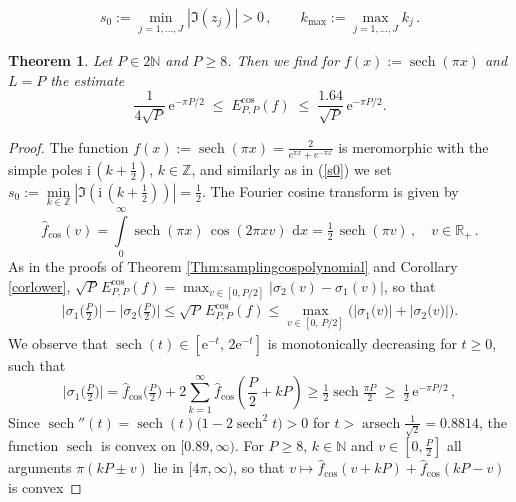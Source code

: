 \documentclass[10pt,a4paper]{amsart}
\newtheorem{theorem}{Theorem}
\newcommand{\Ecos}{E^{\cos}}
\newcommand{\N}{\mathbb N}
\newcommand{\Rp}{{\mathbb R}_{+}}
\newcommand{\Z}{\mathbb Z}
\renewcommand{\d}{\,\mathrm{d}}
\newcommand{\e}{\mathrm e}
\newcommand{\fcos}{{\hat f}_{\cos}}
\renewcommand{\i}{\mathrm i}
\begin{document}
\begin{align}\label{s0}
	s_0 := \min\limits_{j=1,\ldots,J} |\Im ( z_j)| > 0\,, \qquad k_{\max} := \max\limits_{j=1,\ldots,J} k_j\,.
\end{align}

\begin{theorem}
	\label{Ex:sech} Let $P \in 2 \N$  and $P \ge 8$. Then we find for $f(x) := \operatorname{sech}(\pi x)$ and $L=P$ the estimate
	\begin{equation}
		\label{eq:sechlower}
		\textstyle
		 \frac{1}{4\sqrt P}\,\e^{-\pi P/2} \;\leq\;
		\Ecos_{P,P}(f) \;\leq\; \frac{1.64}{\sqrt{P}}\,\e^{-\pi P/2}  .
	\end{equation}

\end{theorem}	

\begin{proof}
	The function $f(x) := \operatorname{sech}(\pi x) = \frac{2}{e^{\pi x} + e^{-\pi x}}$ is meromorphic with the
	simple poles $\i\,(k+\tfrac12)$, $k \in \Z$, and similarly as in (\ref{s0}) we set $s_0:=  \min\limits_{k \in {\mathbb Z}} |\Im( \i\,(k+\tfrac12))| = \frac{1}{2}$. The  Fourier cosine transform is given by
	$$
	\fcos(v) =  \textstyle \int\limits_0^{\infty} \operatorname{sech}(\pi x)\,\cos(2\pi x v)\,\d x
	= \tfrac12\,\operatorname{sech}(\pi v)\,, \quad v \in \Rp\,.
	$$
As in the proofs of Theorem \ref{Thm:samplingcospolynomial} and Corollary \ref{corlower},
$\sqrt{P}\,\Ecos_{P,P}(f) = \max_{v \in [0, P/2]} |\sigma_2(v)-\sigma_1(v)|$, so that
\begin{align}\label{eq:ung}
 \textstyle
\big|\sigma_1\big(\frac{P}{2}\big)\big| - \big|\sigma_2\big(\frac{P}{2}\big)\big| \le \sqrt{P} \, \Ecos_{P,P}(f)
\le   \max\limits_{v \in [0,\, P/2]} \big(\big|\sigma_1\big(v)\big| + \big|\sigma_2\big(v)\big| \big).
\end{align}
We observe that  $ \operatorname{sech} (t)
 \in [ \e^{-t} , \,  2 \e^{-t}]$ is monotonically decreasing
 for $t \ge 0$, such that
$$
 \textstyle \big|\sigma_1\big(\tfrac P2\big)\big|= \fcos\big(\tfrac P2\big) + 2 \sum\limits_{k=1}^\infty \fcos(\frac{P}{2} + kP) \ge  \tfrac12\operatorname{sech}\tfrac{\pi P}{2} \;\geq\; \tfrac12\,\e^{-\pi P/2}\,,
$$
Since $\operatorname{sech}''(t) = \operatorname{sech}(t)\big(1-2\operatorname{sech}^2 t\big)>0$
for $t > \operatorname{arsech}\frac{1}{\sqrt2} = 0.8814$, the function $\operatorname{sech}$ is
convex on $[0.89,\infty)$. For $P \ge 8$, $k \in \N$ and $v \in [0,\frac P2]$ all arguments
$\pi(kP\pm v)$ lie in $[ 4 \pi,\infty)$, so that
$v \mapsto \fcos(v+kP)+\fcos(kP-v)$ is convex

\end{proof}
\end{document}
